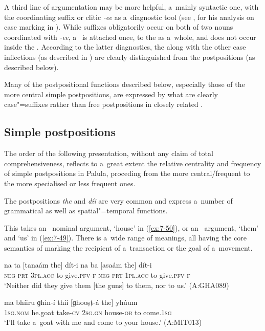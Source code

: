 A third line of argumentation may be more helpful, a~mainly syntactic one, with the coordinating suffix or clitic \textit{-ee} as a~diagnostic tool (see \citealt[77]{baart1999a}, for his analysis on case marking in ). While  suffixes obligatorily occur on both of two nouns coordinated with \textit{-ee}, a~ is attached once, to the  as a~whole, and does not occur inside the . According to the latter diagnostics, the  along with the other case inflections (as described in ) are clearly distinguished from the postpositions (as described below). 


Many of the postpositional functions described below, especially those of the more central simple postpositions, are expressed by what are clearly  case"=suffixes rather than free postpositions in closely related   \citep[115--130]{schmidtkohistani2001}. 


\subsection{Simple postpositions}
\label{subsec:7-2-2}

The order of the following presentation, without any claim of total comprehensiveness, reflects to a~great extent the relative centrality and frequency of simple postpositions in Palula, proceding from the more central/frequent to the more specialised or less frequent ones. 


The postpositions \textit{the} and \textit{díi} are very common and express a~number of grammatical as well as spatial"=temporal functions. 


 This  takes an~ nominal argument, `house' in (\ref{ex:7-50}), or an~  argument, `them' and `us' in (\ref{ex:7-49}). There is a~wide range of meanings, all having the core semantics of marking the recipient of a~transaction or the goal of a~movement. 
\begin{exe}
\ex
\label{ex:7-49}
\gll na ta [tanaám the] dít-i na ba  [asaám the] dít-i \\
\textsc{neg} \textsc{prt} \textsc{3pl.acc} to give.\textsc{pfv-f} \textsc{neg} \textsc{prt} \textsc{1pl.acc} to give.\textsc{pfv-f} \\
\glt `Neither did they give them [the guns] to them, nor to us.' (A:GHA089)
\end{exe}
\begin{exe}
\ex
\label{ex:7-50}
\gll ma bhíiru ɡhin-í thíi [ɡhooṣṭ-á the] yhúum \\
\textsc{1sg.nom} he.goat take-\textsc{cv} \textsc{2sg.gn} house-\textsc{ob} to come.\textsc{1sg} \\
\glt `I'll take a~goat with me and come to your house.' (A:MIT013)
\end{exe}

